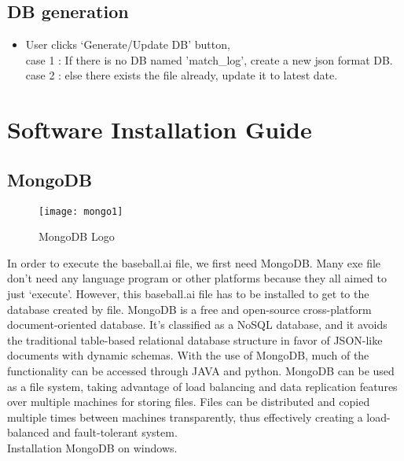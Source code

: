 \documentclass[conference,compsoc, twocolumn]{IEEEtran}
\begin{document}
\subsection{DB generation}

\begin{itemize}
\begin{figure}[H]
\centering\texttt{[image: DBgeneration-fc]}
\caption{DB generation-flow chart}
\end{figure}


\begin{figure}[H]
\centering\texttt{[image: 6-DBGenerate]}
\caption{DB Generation/update}
\end{figure}
\item User clicks ‘Generate/Update DB’ button, \\
case 1 : If there is no DB named 'match\_log', create a new json format DB. \\
case 2 : else there exists the file already, update it to latest date.
\end{itemize}


\section{Software Installation Guide}

\subsection{MongoDB}
\begin{figure}[H]
\centering\texttt{[image: mongo1]}
\caption{MongoDB Logo}
\end{figure}
In order to execute the baseball.ai file, we first need MongoDB. Many exe file don’t need any language program or other platforms because they all aimed to just ‘execute’. However, this baseball.ai file has to be installed to get to the database created by file. MongoDB is a free and open-source cross-platform document-oriented database. It’s classified as a NoSQL database, and it avoids the traditional table-based relational database structure in favor of JSON-like documents with dynamic schemas. With the use of MongoDB, much of the functionality can be accessed through JAVA and python. MongoDB can be used as a file system, taking advantage of load balancing and data replication features over multiple machines for storing files. Files can be distributed and copied multiple times between machines transparently, thus effectively creating a load-balanced and fault-tolerant system. \\
Installation MongoDB on windows.\\
\end{document}
